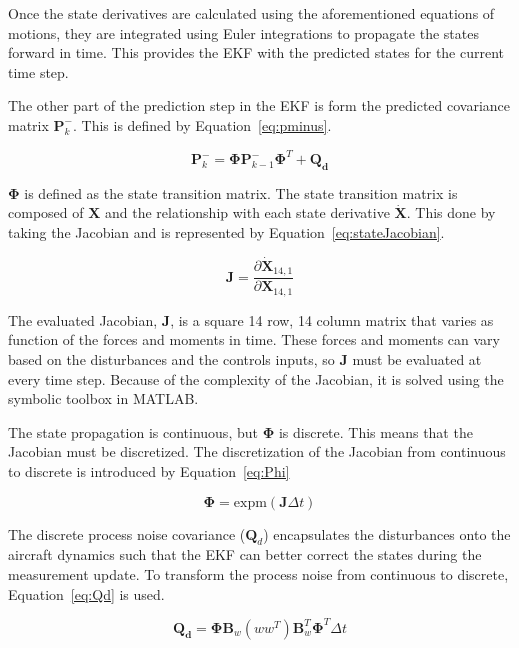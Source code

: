 Once the state derivatives are calculated using the aforementioned equations of motions, they are integrated using Euler integrations to propagate the states forward in time. This provides the EKF with the predicted states for the current time step.

The other part of the prediction step in the EKF is form the predicted covariance matrix \(\mathbf{P}^-_{k}\). This is defined by Equation~\ref{eq:pminus}.

\begin{equation}\label{eq:pminus}
    \mathbf{P}^-_{k} = \mathbf{\Phi}\mathbf{P}^-_{k-1} \mathbf{\Phi}^T + \mathbf{Q_d}
\end{equation}

\( \mathbf{\Phi}\) is defined as the state transition matrix. The state transition matrix is composed of \(\mathbf{X}\) and the relationship with each state derivative \( \dot{\mathbf{X}}\). This done by taking the Jacobian and is represented by Equation~\ref{eq:stateJacobian}.

\begin{equation}\label{eq:stateJacobian}
    \mathbf{J} = \frac{\partial \dot{\mathbf{X}}_{14,1}}{\partial \mathbf{X}_{14,1}}
\end{equation}

The evaluated Jacobian, \(\mathbf{J}\), is a square 14 row, 14 column matrix that varies as function of the forces and moments in time. These forces and moments can vary based on the disturbances and the controls inputs, so \(\mathbf{J}\) must be evaluated at every time step. Because of the complexity of the Jacobian, it is solved using the symbolic toolbox in MATLAB\@.

The state propagation is continuous, but \(\mathbf{\Phi}\) is discrete. This means that the Jacobian must be discretized. The discretization of the Jacobian from continuous to discrete is introduced by Equation~\ref{eq:Phi}

\begin{equation}\label{eq:Phi}
    \mathbf{\Phi} = \textrm{expm}(\mathbf{J}\Delta t)
\end{equation}

The discrete process noise covariance (\(\mathbf{Q}_d\)) encapsulates the disturbances onto the aircraft dynamics such that the EKF can better correct the states during the measurement update. To transform the process noise from continuous to discrete, Equation~\ref{eq:Qd} is used.

\begin{equation}\label{eq:Qd}
    \mathbf{Q_d} = \mathbf{\Phi}\mathbf{B}_w \left(ww^T\right) \mathbf{B}_w^T \mathbf{\Phi}^T \Delta t
\end{equation}

